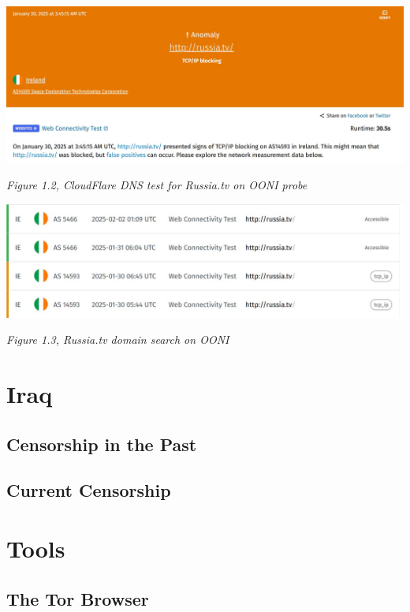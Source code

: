 \centerline{\includegraphics[width=480pt]{Griff/Latex/TCD SCSS CAPSTONE/Literature Review/CloudFlare Block Russiatv.jpg}}

\centerline{\textit{Figure 1.2, CloudFlare DNS test for Russia.tv on OONI probe}}

\centerline{\includegraphics[width=480pt]{Griff/Latex/TCD SCSS CAPSTONE/Literature Review/RussiaTV search OONI.jpg}}

\centerline{\textit{Figure 1.3, Russia.tv domain search on OONI}}

\section{Iraq}

\subsection{Censorship in the Past}



\subsection{Current Censorship}



\section{Tools}

\subsection{The Tor Browser}

